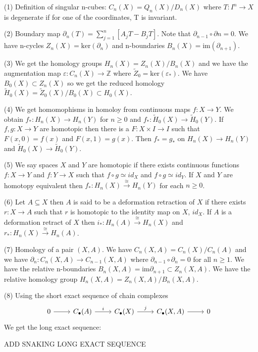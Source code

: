 \documentclass{article}
\begin{document}
(1) Definition of singular n-cubes: $C_n(X) = Q_n(X)/ D_n(X)$ where $T: I^n \to X$ is degenerate if for one of the coordinates, T is invariant.

(2) Boundary map $\partial_n(T) = \sum_{j=1}^n [A_jT - B_jT]$. Note that $\partial_{n-1} \circ \partial{n} = 0$. We have n-cycles $Z_n(X) = \text{ker}(\partial_n)$ and n-boundaries $B_n(X) = \text{im}(\partial_{n+1})$.

(3) We get the homology groups $H_n(X) = Z_n(X) / B_n(X)$ and we have the augmentation map $\varepsilon: C_n(X) \to \mathbb{Z}$ where $\tilde{Z}_0 = \text{ker}(\varepsilon_*)$. We have $B_0(X) \subset Z_n(X)$ so we get the reduced homology $\tilde{H}_0(X) = \tilde{Z}_0(X) / B_0(X) \subset H_0(X)$.

(4) We get homomophisms in homoloy from continuous maps $f: X \to Y$. We obtain $f_*:H_n(X) \to H_n(Y)$ for $n \geq 0$ and $f_*: \tilde{H}_0(X) \to \tilde{H}_0(Y)$. If $f,g:X \to Y$ are homotopic then there is a $F: X \times I \to I$ such that $F(x,0) = f(x)$ and $F(x,1) = g(x)$. Then $f_* = g_*$ on $H_n(X) \to H_n(Y)$ and $\tilde{H}_0(X) \to \tilde{H}_0(Y)$.

(5) We say spaces $X$ and $Y$ are homotopic if there exists continuous functions $f: X \to Y$ and $f: Y \to X$ such that $f \circ g \simeq id_X$ and $f \circ g \simeq id_Y$. If $X$ and $Y$ are homotopy equivalent then $f_*: H_n(X) \xrightarrow{\cong} H_n(Y)$ for each $n \geq 0$.

(6) Let $A \subseteq X$ then $A$ is said to be a deformation retraction of $X$ if there exists $r: X \to A$ such that $r$ is homotopic to the identity map on $X$, $id_X$. If $A$ is a deformation retract of $X$ then $i_*: H_n(A) \xrightarrow{\cong} H_n(X)$ and $r_*: H_n(X) \xrightarrow{\cong} H_n(A)$.

(7) Homology of a pair $(X,A)$. We have $C_n(X,A) = C_n(X) / C_n(A)$ and we have $\partial_n: C_n(X,A) \to C_{n-1}(X,A)$ where $\partial_{n-1} \circ \partial_n = 0$ for all $n \geq 1$. We have the relative n-boundaries $B_n(X,A) = \text{im}\partial_{n+1} \subset Z_n(X,A)$. We have the relative homology group $H_n(X,A) = Z_n(X,A) / B_n(X,A)$.

(8) Using the short exact sequence of chain complexes
\[
\begin{tikzcd}
0 \arrow[r] & C_\bullet(A) \arrow[r, "i"] & C_\bullet(X) \arrow[r, "j"] & C_\bullet(X,A) \arrow[r] & 0
\end{tikzcd}
\]
We get the long exact sequence:

ADD SNAKING LONG EXACT SEQUENCE
\end{document}
